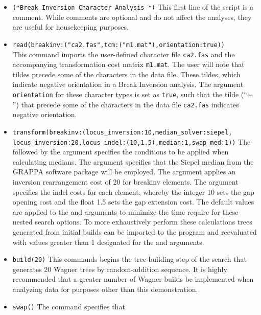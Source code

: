 \begin{itemize}
\item \texttt{(*Break Inversion Character Analysis *)} This first
line of the script is a comment. While comments are optional and
do not affect the analyses, they are useful for housekeeping purposes.
\item \texttt{read(breakinv:("ca2.fas",tcm:("m1.mat"),orientation:true))}\\ 
This command imports the user-defined 
character file \texttt{ca2.fas} and the accompanying transformation
cost matrix \texttt{m1.mat}.  The user will note that tildes precede
some of the characters in the data file.  These tildes, which
indicate negative orientation in a Break Inversion analysis. The
argument \texttt{orientation} for these character types is set as
\texttt{true}, such that the tilde (``$\sim$'') that precede some
of the characters in the data file \texttt{ca2.fas} indicates
negative orientation.  
\item \texttt{transform(breakinv:(locus\_inversion:10,median\_solver:siepel,\\
locus\_inversion:20,locus\_indel:(10,1.5),median:1,swap\_med:1))}
The  followed by the argument 
specifies the conditions to be applied when calculating medians.
The argument  specifies that
the Siepel median from the GRAPPA software package \cite{baderetal2002}
will be employed.  The argument 
applies an inversion rearrangement cost of 20 for \poyargument
{breakinv} elements. The argument 
specifies the indel costs for each  element,
whereby the integer 10 sets the gap opening cost and the float 1.5
sets the gap extension cost.  The default values are applied to the
 and  arguments to
minimize the time require for these nested search options.   To
more exhaustively perform these calculations trees generated from
initial builds can be imported to the program and reevaluated with
values greater than 1 designated for the  and
 arguments.  
\item \texttt{build(20)} This commands begins the tree-building step
of the search that generates 20 Wagner trees by  random-addition sequence.  
It is highly recommended that a greater number of Wagner builds be 
implemented when analyzing data for  purposes other than this demonstration.
\item \texttt{swap()} The  command specifies that

\end{itemize}
